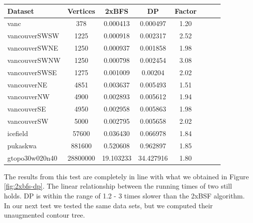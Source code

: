 \begin{center}
\begin{tabular}{l*{6}{c}r}

\label{table:blq}%

Dataset            & Vertices        & 2xBFS              & DP                   & Factor \\
\hline
vanc	           & 378	         &0.000413	          & 0.000497	         &1.20    \\
vancouverSWSW	   & 1225	         &0.000918	          & 0.002317	         &2.52    \\
vancouverSWNE	   & 1250	         &0.000937	          & 0.001858	         &1.98    \\
vancouverSWNW	   & 1250	         &0.000798	          & 0.002454	         &3.08    \\
vancouverSWSE	   & 1275	         &0.001009	          & 0.00204	             &2.02    \\
vancouverNE	       & 4851	         &0.003637	          & 0.005493	         &1.51    \\
vancouverNW	       & 4900	         &0.002893	          & 0.005612	         &1.94    \\
vancouverSE	       & 4950	         &0.002958	          & 0.005863	         &1.98    \\
vancouverSW	       & 5000	         &0.002795	          & 0.005658	         &2.02    \\
icefield	       & 57600	         &0.036430	          & 0.066978	         &1.84    \\
pukaskwa	       & 881600	         &0.520608	          & 0.962897	         &1.85    \\
gtopo30w020n40	   & 28800000	     &19.103233	          & 34.427916	         &1.80    \\

\end{tabular}
\end{center}

The results from this test are completely in line with what we obtained in Figure \ref{fig:2xbfs-dp}. The linear relationship between the running times of two still holds. DP is within the range of 1.2 - 3 times slower than the 2xBSF algorithm. In our next test we tested the same data sets, but we computed their unaugmented contour tree.

